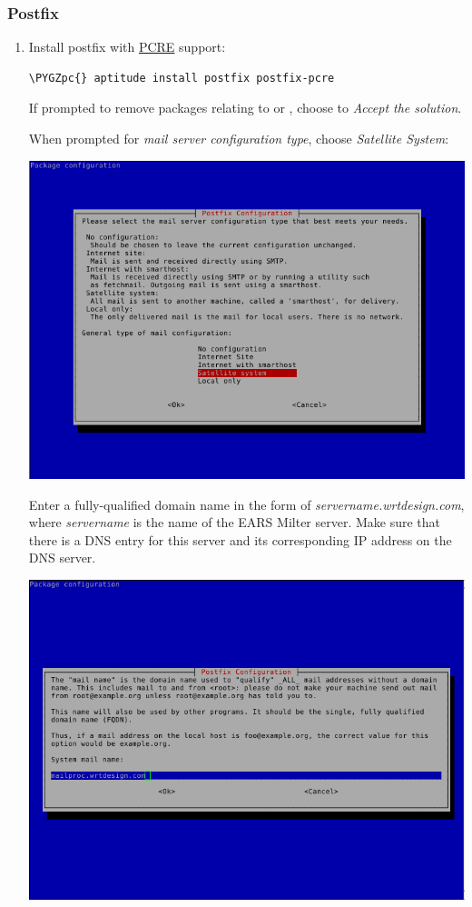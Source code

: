 \documentclass[letterpaper,10pt,english]{sphinxmanual}
\def\PYGZpc{\char`\%}
\begin{document}
\subsubsection{Postfix}
\label{installation:postfix}\begin{enumerate}
\item {} 
Install postfix with \href{http://www.pcre.org}{PCRE} support:

\begin{Verbatim}[commandchars=\\\{\},formatcom=\footnotesize]
\PYGZpc{} aptitude install postfix postfix-pcre
\end{Verbatim}

If prompted to remove packages relating to  or ,
choose to \emph{Accept the solution}.

When prompted for \emph{mail server configuration type}, choose
\emph{Satellite System}:

\includegraphics{postfix1.png}

Enter a fully-qualified domain name in the form of
\emph{servername.wrtdesign.com}, where \emph{servername} is the name of the EARS
Milter server. Make sure that there is a DNS entry for this server and its
corresponding IP address on the DNS server.

\includegraphics{postfix2.png}


\end{enumerate}
\end{document}
